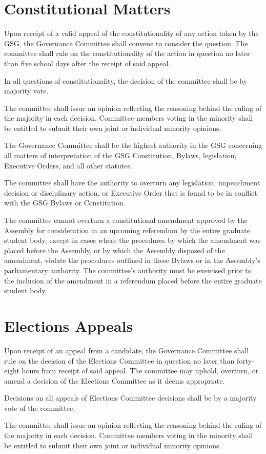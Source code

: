 \section{Constitutional Matters}
\begin{bylaws-number}
  \item Upon receipt of a valid appeal of the constitutionality of any action taken by the GSG, the Governance Committee shall convene to consider the question. The committee shall rule on the constitutionality of the action in question no later than five school days after the receipt of said appeal.
  \item In all questions of constitutionality, the decision of the committee shall be by majority vote.
  \item The committee shall issue an opinion reflecting the reasoning behind the ruling of the majority in each decision. Committee members voting in the minority shall be entitled to submit their own joint or individual minority opinions.
  \item The Governance Committee shall be the highest authority in the GSG concerning all matters of interpretation of the GSG Constitution, Bylaws, legislation, Executive Orders, and all other statutes.
  \item The committee shall have the authority to overturn any legislation, impeachment decision or disciplinary action, or Executive Order that is found to be in conflict with the GSG Bylaws or Constitution.
  \item The committee cannot overturn a constitutional amendment approved by the Assembly for consideration in an upcoming referendum by the entire graduate student body, except in cases where the procedures by which the amendment was placed before the Assembly, or by which the Assembly disposed of the amendment, violate the procedures outlined in these Bylaws or in the Assembly’s parliamentary authority. The committee’s authority must be exercised prior to the inclusion of the amendment in a referendum placed before the entire graduate student body.
\end{bylaws-number}

\section{Elections Appeals}
\begin{bylaws-number}
  \item Upon receipt of an appeal from a candidate, the Governance Committee shall rule on the decision of the Elections Committee in question no later than forty-eight hours from receipt of said appeal. The committee may uphold, overturn, or amend a decision of the Elections Committee as it deems appropriate.
  \item Decisions on all appeals of Elections Committee decisions shall be by a majority vote of the committee.
  \item The committee shall issue an opinion reflecting the reasoning behind the ruling of the majority in each decision. Committee members voting in the minority shall be entitled to submit their own joint or individual minority opinions.
\end{bylaws-number}